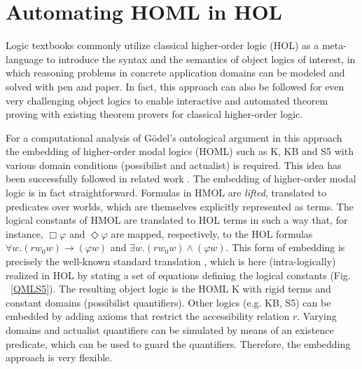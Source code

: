 \documentclass{article}
\newcommand{\imp}{\rightarrow}
\begin{document}
\section{Automating HOML in HOL}

Logic textbooks \cite{ToDo: which} commonly utilize classical higher-order logic (HOL)
\cite{Church} as a meta-language to introduce the syntax and the
semantics of object logics of interest, in which reasoning
problems in concrete application domains can be modeled and solved
with pen and paper. In fact, this approach can also be followed for even very challenging
object logics to
enable interactive and automated theorem proving with existing theorem provers for classical
higher-order logic.


For a computational analysis of G\"odel's ontological argument in this
approach the embedding of higher-order modal logics (HOML) such as K,
KB and S5 with various domain conditions (possibilist and actualist)
is required. This idea has been successfully followed in related work
\cite{C40}. The embedding of higher-order modal logic is in fact
straightforward. Formulas in HMOL are \emph{lifted}, translated to predicates
over worlds, which are themselves explicitly represented as
terms. The logical constants of HMOL are translated to HOL terms in such a way that, for instance, 
$\Box \varphi$ and $\Diamond \varphi$ are mapped, respectively, to the HOL formulas $\forall w. (r w_0 w) \imp (\varphi w)$ and $\exists w. (r w_0 w) \wedge (\varphi w)$. This form of embedding is precisely the well-known standard translation \cite{Ohlbach,ModalLogicPatrickBlackburn},
which is here (intra-logically) realized in HOL by stating a set of
equations defining the logical constants (Fig. ~\ref{QMLS5}). The resulting object logic is the HOML K with rigid terms and constant domains (possibilist quantifiers). Other logics (e.g. KB, S5) can be embedded by adding axioms that restrict the accessibility relation $r$. Varying domains and actualist quantifiers can be simulated by means of an existence predicate, which can be used to guard the quantifiers. Therefore, the embedding approach is very flexible.
\end{document}
